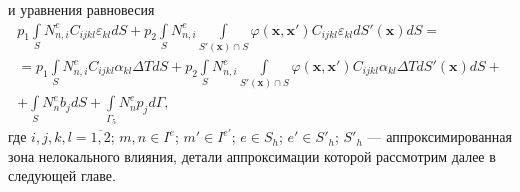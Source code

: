 и уравнения равновесия
\begin{multline}
	\label{eq:StressIntegrateIndices}
	p_1 \int\limits_S N_{n,i}^{e} C_{ijkl} \varepsilon_{kl} dS
	+
	p_2 \int\limits_S N_{n, i}^{e} \int\limits_{S'(\boldsymbol{x}) \cap S}
	\varphi(\boldsymbol{x}, \boldsymbol{x}') C_{ijkl} \varepsilon_{kl} dS'(\boldsymbol{x}) dS
	= \\ =
	p_1 \int\limits_S N_{n,i}^{e} C_{ijkl} \alpha_{kl} \Delta T dS +
	p_2 \int\limits_S N_{n,i}^{e}
	\int\limits_{S'(\boldsymbol{x}) \cap S} 
	\varphi(\boldsymbol{x}, \boldsymbol{x}')
	C_{ijkl} \alpha_{kl} \Delta T dS'(\boldsymbol{x}) dS 
	+ \\ +
	\int\limits_S N_n^{e} b_j dS +
	\int\limits_{\Gamma_5} N_n^{e} p_j d\Gamma,
\end{multline}
где $i,j,k,l = \overline{1, 2}$; $m, n \in I^e$; $m' \in I^{e'}$; $e \in S_h$; $e' \in S'_h$; $S'_h$ --- аппроксимированная зона нелокального влияния, детали аппроксимации которой рассмотрим далее в следующей главе.

